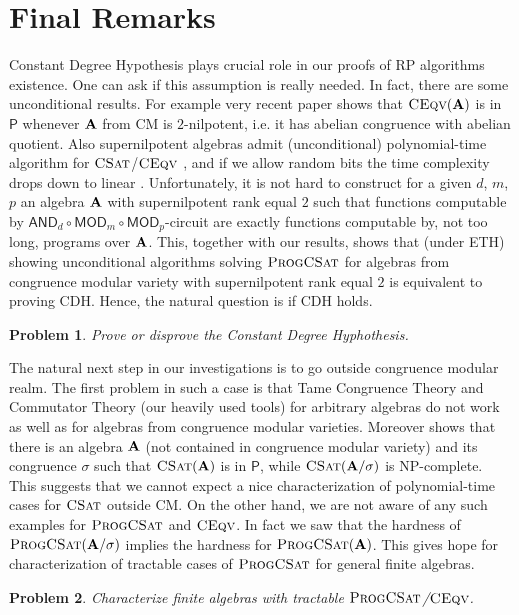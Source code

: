 \documentclass[11pt,a4paper]{amsart}
\newtheorem{prob}{Problem}
\newcommand{\npc}{\textsf{NP}-complete\xspace}
\newcommand{\ptime}{\textsf{P}\xspace}
\newcommand{\rptime}{\textsf{RP}\xspace}
\newcommand{\m}[1]{{\uppercase {\bf{#1}}}}
\newcommand{\gProblem}[2]{\ensuremath{\operatorname{\textup{\textsc{{#2}}}}
		\ifthenelse{\equal{#1}{}}{}{\!\left( {#1} \right)}}}
\newcommand{\ceqv}[1]{\gProblem{#1}{CEqv}}
\newcommand{\csat}[1]{\gProblem{#1}{CSat}}
\newcommand{\progcsat}[1]{\gProblem{#1}{ProgCSat}}
\newcommand{\ccand}{\mathsf{AND}}
\newcommand{\ccmod}{\mathsf{MOD}}
\begin{document}
\section{Final Remarks}

Constant Degree Hypothesis plays crucial role in our proofs of \rptime algorithms existence. One can ask if this assumption is really needed. In fact, there are some  unconditional results. For example very recent paper \cite{KawalekKK19} shows that \ceqv{\m A} is in $\ptime$ whenever $\m A$  from CM is $2$-nilpotent, i.e. it has abelian congruence with abelian quotient. Also supernilpotent algebras admit (unconditional) polynomial-time algorithm for \csat{}/\ceqv{} \cite{aichmud-2010, komp2017, IdziakK22}, and if we allow random bits the time complexity drops down to linear \cite{KawalekK}. Unfortunately, it is not hard to construct for a given $d$, $m$, $p$ an algebra $\m A$ with supernilpotent rank equal $2$ such that functions computable by $\ccand_d \circ \ccmod_m \circ \ccmod_p$-circuit are exactly functions computable by, not too long, programs over $\m A$.  This, together with our results, shows that (under ETH) showing unconditional algorithms solving \progcsat{} for algebras from congruence modular variety with supernilpotent rank equal $2$ is equivalent to proving CDH. Hence, the natural question is if CDH holds.
\begin{prob}
Prove or disprove the Constant Degree Hyphothesis.
 \end{prob}

The natural next step in our investigations is to go outside congruence modular realm. The first problem in such a case is that Tame Congruence Theory and Commutator Theory (our heavily used tools) for arbitrary algebras do not work as well as for algebras from congruence modular varieties.  Moreover \cite[Example 2.8]{IdziakK22} shows that there is an algebra $\m A$ (not contained in congruence modular variety) and its congruence $\sigma$ such that $\csat{\m A}$ is in $\ptime$, while $\csat{\m A/\sigma}$ is \npc. This suggests that we cannot expect a nice characterization of polynomial-time cases for \csat{} outside CM. On the other hand, we are not aware of any such examples for \progcsat{} and \ceqv{}. In fact we saw that the hardness of $\progcsat{\m A/\sigma}$ implies the hardness for $\progcsat{\m A}$. This gives hope for characterization of tractable cases of \progcsat{} for general finite algebras.

\begin{prob}
 Characterize finite algebras with tractable \progcsat{}/\ceqv{}.
 \end{prob}
 


  
\end{document}

